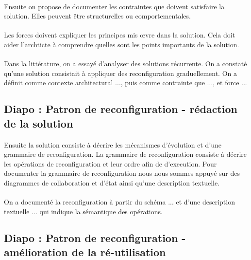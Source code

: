 \paragraph{}
Ensuite on propose de documenter les contraintes que doivent satisfaire
la solution. Elles peuvent être structurelles ou comportementales.

\paragraph{}
Les forces doivent expliquer les principes mis \oe{}vre dans la
solution. Cela doit aider l'archticte à comprendre quelles sont les
points importants de la solution.  

\paragraph{}
Dans la littérature, on a essayé d'analyser des solutions
récurrente. On a constaté qu'une solution consistait à appliquer des
reconfiguration graduellement. On a définit comme contexte
architectural ..., puis comme contrainte que ..., et force ...  

\subsection{Diapo : Patron de reconfiguration - rédaction de la solution}

\paragraph{}
Ensuite la solution consiste à décrire les mécanismes d'évolution
et d'une grammaire de reconfiguration. La grammaire de reconfiguration
consiste à  décrire les opérations de reconfiguration et leur ordre
afin de d'execution. Pour documenter la grammaire de reconfiguration
nous nous sommes appuyé sur des diagrammes de collaboration et d'état
ainsi qu'une description textuelle. 
 
\paragraph{}
On a documenté la reconfiguration à partir du schéma ... 
et d'une description textuelle ... qui indique la sémantique des
opérations. 

\subsection{Diapo : Patron de reconfiguration - amélioration de la
ré-utilisation}

